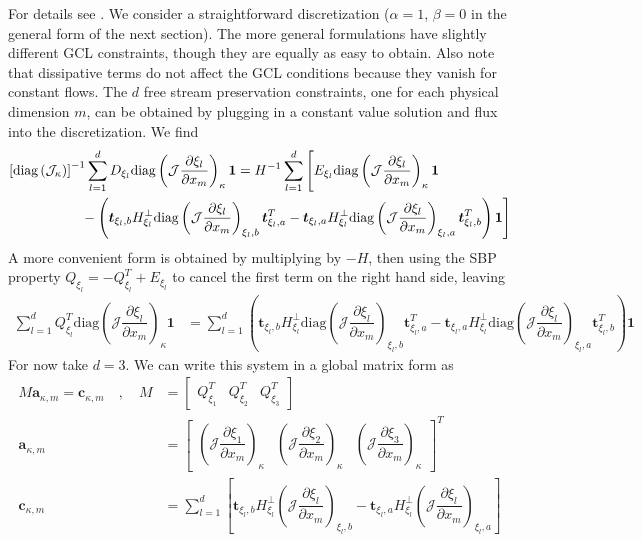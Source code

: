 \documentclass[12pt,a4paper]{article}
\newcommand{\pder}[2][]{\dfrac{\partial #1}{\partial #2}} %
\newcommand{\fn}[1]{\mathcal{#1}} %
\begin{document}
For details see \cite{del_rey_fernandez_extension_2019}. We consider a straightforward discretization ($\alpha=1$, $\beta=0$ in the general form of the next section). The more general formulations have slightly different GCL constraints, though they are equally as easy to obtain. Also note that dissipative terms do not affect the GCL conditions because they vanish for constant flows. The $d$ free stream preservation constraints, one for each physical dimension $m$, can be obtained by plugging in a constant value solution and flux into the discretization. We find
\begin{align*}
 \left[ \text{diag}\left( \fn{J}_\kappa \right) \right]^{-1} \sum_{l=1}^d  D_{\xi_l} \text{diag} \left( \fn{J} \pder[\xi_l]{x_m} \right)_\kappa \bm{1} &= H^{-1} \sum_{l=1}^d \Bigg[ E_{\xi_l} \text{diag}  \left( \fn{J} \pder[\xi_l]{x_m} \right)_{\kappa} \bm{1} \\
& \hspace{-4cm} - \left( \bm{t}_{\xi_l, b} H^{\bot}_{\xi_l}  \text{diag} \left( \fn{J} \pder[\xi_l]{x_m} \right)_{\xi_l,b} \bm{t}_{\xi_l, a}^T - \bm{t}_{\xi_l, a} H^{\bot}_{\xi_l} \text{diag} \left( \fn{J} \pder[\xi_l]{x_m} \right)_{\xi_l,a} \bm{t}_{\xi_l, b}^T  \right) \bm{1} \Bigg]
\end{align*}
A more convenient form is obtained by multiplying by $-H$, then using the SBP property $Q_{\xi_l} = -Q_{\xi_l}^T + E_{\xi_l}$ to cancel the first term on the right hand side, leaving
\begin{align*}
 \sum_{l=1}^d Q_{\xi_l}^T \text{diag} \left( \fn{J} \pder[\xi_l]{x_m} \right)_\kappa \bm{1} &= \sum_{l = 1}^d  \left( \bm{t}_{\xi_l,b} H^{\bot}_{\xi_l} \text{diag} \left( \fn{J} \pder[\xi_l]{x_m} \right)_{\xi_l,b} \bm{t}^T_{\xi_l,a} - \bm{t}_{\xi_l,a} H^{\bot}_{\xi_l} \text{diag} \left( \fn{J} \pder[\xi_l]{x_m} \right)_{\xi_l,a} \bm{t}_{\xi_l,b}^T  \right) \bm{1} 
\end{align*}
For now take $d=3$. We can write this system in a global matrix form as
\begin{align*}
M \bm{a}_{\kappa , m} = \bm{c}_{\kappa , m} \quad , \quad M &= \begin{bmatrix}
Q_{\xi_1}^T & Q_{\xi_2}^T & Q_{\xi_3}^T
\end{bmatrix} \\
\bm{a}_{\kappa , m} &= \begin{bmatrix}
 \left( \fn{J} \pder[\xi_1]{x_m} \right)_\kappa &  \left( \fn{J} \pder[\xi_2]{x_m} \right)_\kappa & \left( \fn{J} \pder[\xi_3]{x_m} \right)_\kappa \end{bmatrix}^T \\
 \bm{c}_{\kappa , m} &= \sum_{l = 1}^d \left[ \bm{t}_{\xi_l,b} H^{\bot}_{\xi_l}  \left( \fn{J} \pder[\xi_l]{x_m} \right)_{\xi_l,b} - \bm{t}_{\xi_l,a} H^{\bot}_{\xi_l}  \left( \fn{J} \pder[\xi_l]{x_m} \right)_{\xi_l,a} \right]
\end{align*}
\end{document}
